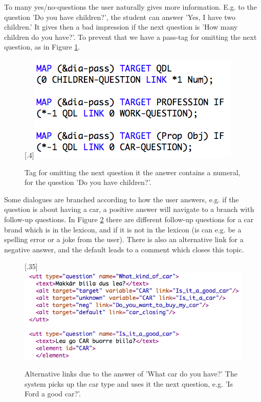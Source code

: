 \documentclass[11pt]{article}
\begin{document}
To many yes/no-questions the user naturally gives more information. E.g. to the question 'Do you have children?', the student can answer 'Yes, I have two children.' It gives then a bad impression if the next question is 'How many children do you have?'. To prevent that we have a pass-tag for omitting the next question, as in Figure \ref{omit}.

\begin{figure}[htbp]
\begin{center}
\scalebox{.4}[.4]{\includegraphics{presentation/img/pass_rules.png}}\\
\caption{Tag for omitting the next question it the answer contains a numeral, for the question 'Do you have children?'. 
}
\label{omit}
\end{center}
\end{figure}

 
 
Some dialogues are branched according to how the user answers, e.g. if the question is about having a car, a positive answer will navigate to a branch with follow-up questions. In Figure \ref{car} there are different follow-up questions for a car brand which is in the lexicon, and if it is not in the lexicon (is can e.g. be a spelling error or a joke from the user). There is also an alternative link for a negative answer, and the default leads to a comment which closes this topic.



\begin{figure}[htbp]
\begin{center}
\scalebox{.35}[.35]{\includegraphics{presentation/img/what_car.png}}\\
\caption{Alternative links due to the answer of 'What car do you have?' The system picks up the car type and uses it the next question, e.g. 'Is Ford a good car?'.}
\label{car}
\end{center}
\end{figure}
\end{document}
